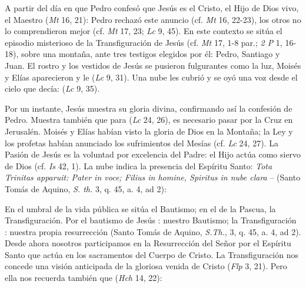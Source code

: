 \begin{ccebody}

 A partir del día en que Pedro confesó que Jesús es el Cristo, el Hijo de Dios vivo, el Maestro  (\textit{Mt} 16, 21): Pedro rechazó este anuncio (cf. \textit{Mt} 16, 22-23), los otros no lo comprendieron mejor (cf. \textit{Mt} 17, 23; \textit{Lc} 9, 45). En este contexto se sitúa el episodio misterioso de la Transfiguración de Jesús (cf. \textit{Mt} 17, 1-8 par.; \textit{2 P} 1, 16-18), sobre una montaña, ante tres testigos elegidos por él: Pedro, Santiago y Juan. El rostro y los vestidos de Jesús se pusieron fulgurantes como la luz, Moisés y Elías aparecieron y le  (\textit{Lc} 9, 31). Una nube les cubrió y se oyó una voz desde el cielo que decía:  (\textit{Lc} 9, 35).

 Por un instante, Jesús muestra su gloria divina, confirmando así la confesión de Pedro. Muestra también que para  (\textit{Lc} 24, 26), es necesario pasar por la Cruz en Jerusalén. Moisés y Elías habían visto la gloria de Dios en la Montaña; la Ley y los profetas habían anunciado los sufrimientos del Mesías (cf. \textit{Lc} 24, 27). La Pasión de Jesús es la voluntad por excelencia del Padre: el Hijo actúa como siervo de Dios (cf. \textit{Is} 42, 1). La nube indica la presencia del Espíritu Santo: \textit{Tota Trinitas apparuit: Pater in voce; Filius in homine, Spiritus in nube clara} –  (Santo Tomás de Aquino, \textit{S. th.} 3, q. 45, a. 4, ad 2):


 En el umbral de la vida pública se sitúa el Bautismo; en el de la Pascua, la Transfiguración. Por el bautismo de Jesús : nuestro Bautismo; la Transfiguración : nuestra propia resurrección (Santo Tomás de Aquino, \textit{S.Th.}, 3, q. 45, a. 4, ad 2). Desde ahora nosotros participamos en la Resurrección del Señor por el Espíritu Santo que actúa en los sacramentos del Cuerpo de Cristo. La Transfiguración nos concede una visión anticipada de la gloriosa venida de Cristo  (\textit{Flp} 3, 21). Pero ella nos recuerda también que  (\textit{Hch} 14, 22):


\end{ccebody}
